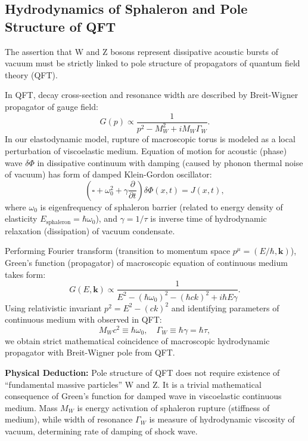 \documentclass[12pt,a4paper]{article}
\begin{document}
\subsection{Hydrodynamics of Sphaleron and Pole Structure of QFT}
The assertion that W and Z bosons represent dissipative acoustic bursts of vacuum must be strictly linked to pole structure of propagators of quantum field theory (QFT).

In QFT, decay cross-section and resonance width are described by Breit-Wigner propagator of gauge field:
\begin{equation}
    G(p) \propto \frac{1}{p^2 - M_W^2 + iM_W\Gamma_W}.
    \label{eq:breit_wigner}
\end{equation}
In our elastodynamic model, rupture of macroscopic torus is modeled as a local perturbation of viscoelastic medium. Equation of motion for acoustic (phase) wave $\delta\Phi$ in dissipative continuum with damping (caused by phonon thermal noise of vacuum) has form of damped Klein-Gordon oscillator:
\begin{equation}
    \left( \square + \omega_0^2 + \gamma \frac{\partial}{\partial t} \right) \delta\Phi(x,t) = J(x,t),
    \label{eq:damped_kg}
\end{equation}
where $\omega_0$ is eigenfrequency of sphaleron barrier (related to energy density of elasticity $E_{\text{sphaleron}}=\hbar\omega_0$), and $\gamma = 1/\tau$ is inverse time of hydrodynamic relaxation (dissipation) of vacuum condensate.

Performing Fourier transform (transition to momentum space $p^\mu = (E/\hbar, \mathbf{k})$), Green's function (propagator) of macroscopic equation of continuous medium takes form:
\begin{equation}
    G(E,\mathbf{k}) \propto \frac{1}{E^2 - (\hbar\omega_0)^2 - (\hbar c k)^2 + i\hbar E \gamma}.
    \label{eq:green_function}
\end{equation}
Using relativistic invariant $p^2 = E^2 - (ck)^2$ and identifying parameters of continuous medium with observed in QFT:
\begin{equation}
    M_W c^2 \equiv \hbar\omega_0, \quad \Gamma_W \equiv \hbar\gamma = \hbar\tau,
    \label{eq:param_identification}
\end{equation}
we obtain strict mathematical coincidence of macroscopic hydrodynamic propagator with Breit-Wigner pole from QFT.

\textbf{Physical Deduction:} Pole structure of QFT does not require existence of ``fundamental massive particles'' W and Z. It is a trivial mathematical consequence of Green's function for damped wave in viscoelastic continuous medium. Mass $M_W$ is energy activation of sphaleron rupture (stiffness of medium), while width of resonance $\Gamma_W$ is measure of hydrodynamic viscosity of vacuum, determining rate of damping of shock wave.
\end{document}
